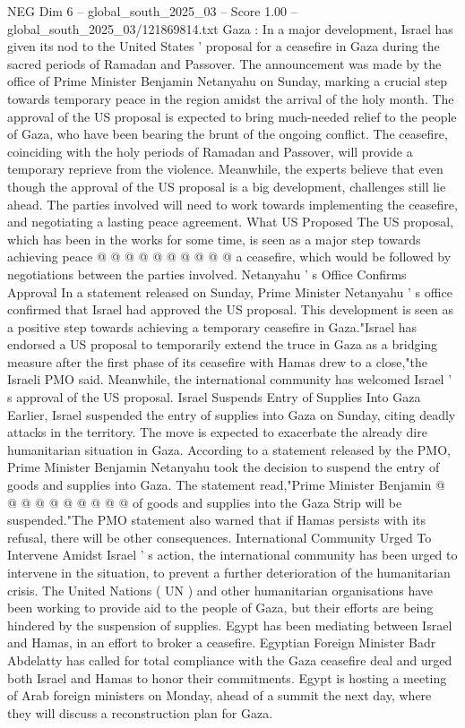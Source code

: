 \begin{textsample}{NEG Dim 6 – global\_south\_2025\_03 – Score 1.00 – global\_south\_2025\_03/121869814.txt}  \label{ex:f6_neg_218}
Gaza : In a major development, Israel has given its nod to the United States ' proposal for a ceasefire in Gaza during the sacred periods of Ramadan and Passover.
The announcement was made by the office of Prime Minister Benjamin Netanyahu on Sunday, marking a crucial step towards temporary peace in the region amidst the arrival of the holy month.
The approval of the US proposal is expected to bring much-needed relief to the people of Gaza, who have been bearing the brunt of the ongoing conflict.
The ceasefire, coinciding with the holy periods of Ramadan and Passover, will provide a temporary reprieve from the violence.
Meanwhile, the experts believe that even though the approval of the US proposal is a big development, challenges still lie ahead.
The parties involved will need to work towards implementing the ceasefire, and negotiating a lasting peace agreement.
What US Proposed The US proposal, which has been in the works for some time, is seen as a major step towards achieving peace @ @ @ @ @ @ @ @ @ @ a ceasefire, which would be followed by negotiations between the parties involved.
Netanyahu ' s Office Confirms Approval In a statement released on Sunday, Prime Minister Netanyahu ' s office confirmed that Israel had approved the US proposal.
This development is seen as a positive step towards achieving a temporary ceasefire in Gaza."Israel has endorsed a US proposal to temporarily extend the truce in Gaza as a bridging measure after the first phase of its ceasefire with Hamas drew to a close,"the Israeli PMO said.
Meanwhile, the international community has welcomed Israel ' s approval of the US proposal.
Israel Suspends Entry of Supplies Into Gaza Earlier, Israel suspended the entry of supplies into Gaza on Sunday, citing deadly attacks in the territory.
The move is expected to exacerbate the already dire humanitarian situation in Gaza.
According to a statement released by the PMO, Prime Minister Benjamin Netanyahu took the decision to suspend the entry of goods and supplies into Gaza.
The statement read,"Prime Minister Benjamin @ @ @ @ @ @ @ @ @ @ of goods and supplies into the Gaza Strip will be suspended."The PMO statement also warned that if Hamas persists with its refusal, there will be other consequences.
International Community Urged To Intervene Amidst Israel ' s action, the international community has been urged to intervene in the situation, to prevent a further deterioration of the humanitarian crisis.
The United Nations ( UN ) and other humanitarian organisations have been working to provide aid to the people of Gaza, but their efforts are being hindered by the suspension of supplies.
Egypt has been mediating between Israel and Hamas, in an effort to broker a ceasefire.
Egyptian Foreign Minister Badr Abdelatty has called for total compliance with the Gaza ceasefire deal and urged both Israel and Hamas to honor their commitments.
Egypt is hosting a meeting of Arab foreign ministers on Monday, ahead of a summit the next day, where they will discuss a reconstruction plan for Gaza.

\end{textsample}
